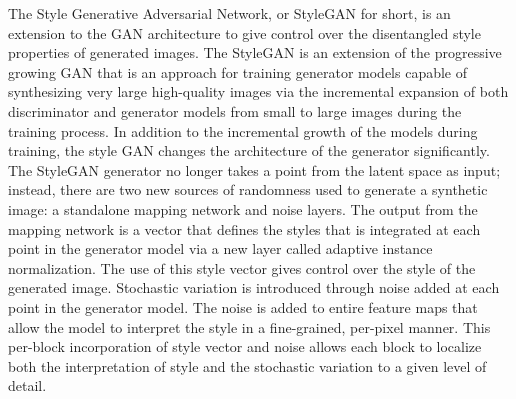 \begin{onehalfspace}
   The Style Generative Adversarial Network, or StyleGAN for short, is an extension to the GAN architecture to give control over the disentangled style properties of generated images. The StyleGAN is an extension of the progressive growing GAN that is an approach for training generator models capable of synthesizing very large high-quality images via the incremental expansion of both discriminator and generator models from small to large images during the training process. In addition to the incremental growth of the models during training, the style GAN changes the architecture of the generator significantly. The StyleGAN generator no longer takes a point from the latent space as input; instead, there are two new sources of randomness used to generate a synthetic image: a standalone mapping network and noise layers. The output from the mapping network is a vector that defines the styles that is integrated at each point in the generator model via a new layer called adaptive instance normalization. The use of this style vector gives control over the style of the generated image. Stochastic variation is introduced through noise added at each point in the generator model. The noise is added to entire feature maps that allow the model to interpret the style in a fine-grained, per-pixel manner. This per-block incorporation of style vector and noise allows each block to localize both the interpretation of style and the stochastic variation to a given level of detail.

\end{onehalfspace}
